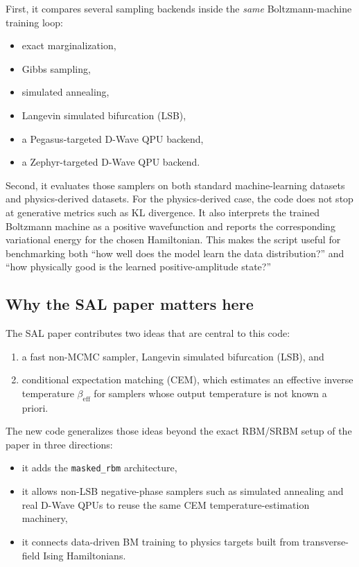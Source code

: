 \documentclass[11pt]{article}
\begin{document}
First, it compares several sampling backends inside the \emph{same} Boltzmann-machine
training loop:
\begin{itemize}
  \item exact marginalization,
  \item Gibbs sampling,
  \item simulated annealing,
  \item Langevin simulated bifurcation (LSB),
  \item a Pegasus-targeted D-Wave QPU backend,
  \item a Zephyr-targeted D-Wave QPU backend.
\end{itemize}

Second, it evaluates those samplers on both standard machine-learning datasets
and physics-derived datasets. For the physics-derived case, the code does not
stop at generative metrics such as KL divergence. It also interprets the trained
Boltzmann machine as a positive wavefunction and reports the corresponding
variational energy for the chosen Hamiltonian. This makes the script useful for
benchmarking both ``how well does the model learn the data distribution?'' and
``how physically good is the learned positive-amplitude state?''

\subsection{Why the SAL paper matters here}

The SAL paper contributes two ideas that are central to this code:
\begin{enumerate}
  \item a fast non-MCMC sampler, Langevin simulated bifurcation (LSB), and
  \item conditional expectation matching (CEM), which estimates an effective
  inverse temperature $\beta_{\mathrm{eff}}$ for samplers whose output temperature
  is not known a priori.
\end{enumerate}

The new code generalizes those ideas beyond the exact RBM/SRBM setup of the
paper in three directions:
\begin{itemize}
  \item it adds the \texttt{masked\_rbm} architecture,
  \item it allows non-LSB negative-phase samplers such as simulated annealing and
  real D-Wave QPUs to reuse the same CEM temperature-estimation machinery,
  \item it connects data-driven BM training to physics targets built from
  transverse-field Ising Hamiltonians.
\end{itemize}
\end{document}
